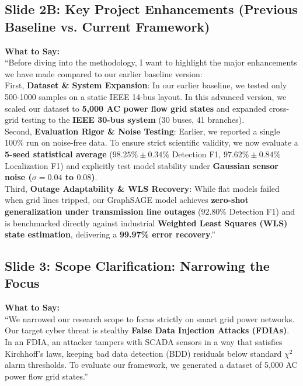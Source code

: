 \documentclass[11pt,a4paper]{article}
\begin{document}
\subsection{Slide 2B: Key Project Enhancements (Previous Baseline vs. Current Framework)}
\begin{mdframed}[style=saystyle]
\textbf{What to Say:}\\
``Before diving into the methodology, I want to highlight the major enhancements we have made compared to our earlier baseline version:\\

First, \textbf{Dataset \& System Expansion}: In our earlier baseline, we tested only 500-1000 samples on a static IEEE 14-bus layout. In this advanced version, we scaled our dataset to \textbf{5,000 AC power flow grid states} and expanded cross-grid testing to the \textbf{IEEE 30-bus system} (30 buses, 41 branches).\\

Second, \textbf{Evaluation Rigor \& Noise Testing}: Earlier, we reported a single 100\% run on noise-free data. To ensure strict scientific validity, we now evaluate a \textbf{5-seed statistical average} ($98.25\% \pm 0.34\%$ Detection F1, $97.62\% \pm 0.84\%$ Localization F1) and explicitly test model stability under \textbf{Gaussian sensor noise ($\sigma = 0.04$ to $0.08$)}.\\

Third, \textbf{Outage Adaptability \& WLS Recovery}: While flat models failed when grid lines tripped, our GraphSAGE model achieves \textbf{zero-shot generalization under transmission line outages} ($92.80\%$ Detection F1) and is benchmarked directly against industrial \textbf{Weighted Least Squares (WLS) state estimation}, delivering a \textbf{99.97\% error recovery}.''
\end{mdframed}

\subsection{Slide 3: Scope Clarification: Narrowing the Focus}
\begin{mdframed}[style=saystyle]
\textbf{What to Say:}\\
``We narrowed our research scope to focus strictly on smart grid power networks. Our target cyber threat is stealthy \textbf{False Data Injection Attacks (FDIAs)}. In an FDIA, an attacker tampers with SCADA sensors in a way that satisfies Kirchhoff's laws, keeping bad data detection (BDD) residuals below standard $\chi^2$ alarm thresholds. To evaluate our framework, we generated a dataset of 5,000 AC power flow grid states.''
\end{mdframed}
\end{document}
